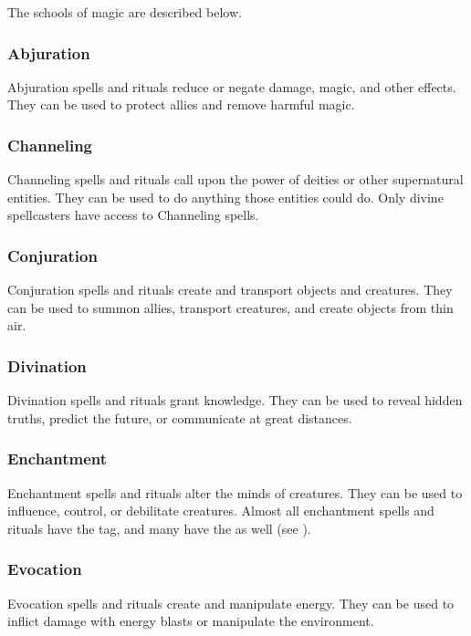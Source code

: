         The schools of magic are described below.

        \subsubsection{Abjuration}
            Abjuration spells and rituals reduce or negate damage, magic, and other effects.
            They can be used to protect allies and remove harmful magic.

        \subsubsection{Channeling}
            Channeling spells and rituals call upon the power of deities or other supernatural entities.
            They can be used to do anything those entities could do.
            Only divine spellcasters have access to Channeling spells.

        \subsubsection{Conjuration}
            Conjuration spells and rituals create and transport objects and creatures.
            They can be used to summon allies, transport creatures, and create objects from thin air.

        \subsubsection{Divination}
            Divination spells and rituals grant knowledge.
            They can be used to reveal hidden truths, predict the future, or communicate at great distances.

        \subsubsection{Enchantment}
            Enchantment spells and rituals alter the minds of creatures.
            They can be used to influence, control, or debilitate creatures.
            Almost all enchantment spells and rituals have the  tag, and many have the  as well (see ).

        \subsubsection{Evocation}
            Evocation spells and rituals create and manipulate energy.
            They can be used to inflict damage with energy blasts or manipulate the environment.

